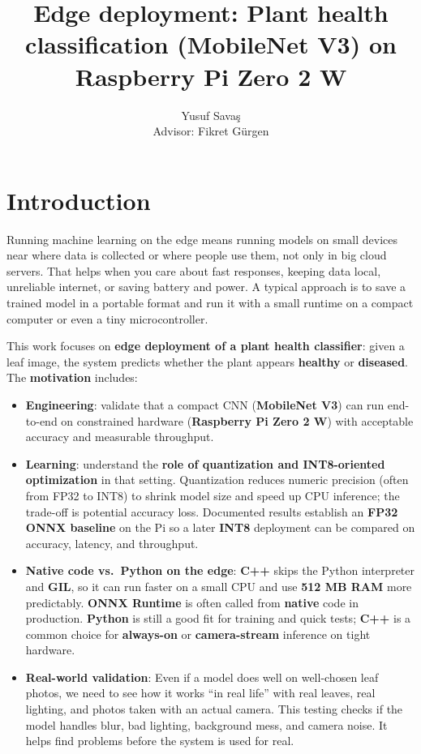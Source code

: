 \documentclass[a4paper,onesided,12pt]{report}
\title{Edge deployment: Plant health classification (MobileNet V3) on Raspberry Pi Zero 2 W}
\author{Yusuf Savaş \\ Advisor: Fikret Gürgen}
\begin{document}
\maketitle{}
\tableofcontents


\chapter{Introduction}

Running machine learning on the edge means running models on small devices near where data is collected or where people use them, not only in big cloud servers. That helps when you care about fast responses, keeping data local, unreliable internet, or saving battery and power. A typical approach is to save a trained model in a portable format and run it with a small runtime on a compact computer or even a tiny microcontroller.

This work focuses on \textbf{edge deployment of a plant health classifier}: given a leaf image, the system predicts whether the plant appears \textbf{healthy} or \textbf{diseased}. The \textbf{motivation} includes:

\begin{itemize}
\item \textbf{Engineering}: validate that a compact CNN (\textbf{MobileNet V3}) can run end-to-end on constrained hardware (\textbf{Raspberry Pi Zero 2 W}) with acceptable accuracy and measurable throughput.
\item \textbf{Learning}: understand the \textbf{role of quantization and INT8-oriented optimization} in that setting. Quantization reduces numeric precision (often from FP32 to INT8) to shrink model size and speed up CPU inference; the trade-off is potential accuracy loss. Documented results establish an \textbf{FP32 ONNX baseline} on the Pi so a later \textbf{INT8} deployment can be compared on accuracy, latency, and throughput.
\item \textbf{Native code vs.\ Python on the edge}: \textbf{C++} skips the Python interpreter and \textbf{GIL}, so it can run faster on a small CPU and use \textbf{512 MB RAM} more predictably. \textbf{ONNX Runtime} is often called from \textbf{native} code in production. \textbf{Python} is still a good fit for training and quick tests; \textbf{C++} is a common choice for \textbf{always-on} or \textbf{camera-stream} inference on tight hardware.
\item \textbf{Real-world validation}: Even if a model does well on well-chosen leaf photos, we need to see how it works ``in real life'' with real leaves, real lighting, and photos taken with an actual camera. This testing checks if the model handles blur, bad lighting, background mess, and camera noise. It helps find problems before the system is used for real.
\end{itemize}
\end{document}
